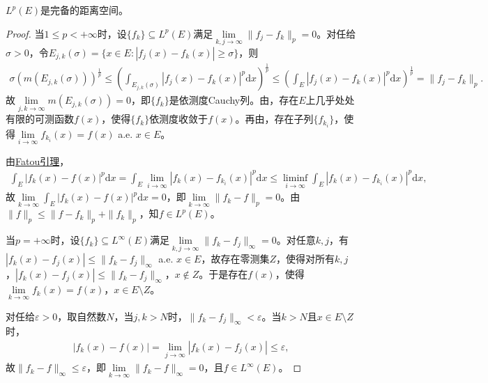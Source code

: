\documentclass[../../main.tex]{subfiles}%
\begin{document}
\begin{theorem}\label{theorem:Riesz-Fischer定理的另一种常用形式}
$L^p(E)$是完备的距离空间。
\end{theorem}
\begin{proof}

当$1\leqslant p<+\infty$时，设$\{f_k\}\subseteq L^p(E)$满足$\lim\limits_{k,j\to\infty}\|f_j-f_k\|_p=0$。对任给$\sigma>0$，令$E_{j,k}(\sigma)=\{x\in E:|f_j(x)-f_k(x)|\geqslant\sigma\}$，则
\begin{align*}
\sigma(m(E_{j,k}(\sigma)))^{\frac{1}{p}}\leqslant\left(\int_{E_{j,k}(\sigma)}|f_j(x)-f_k(x)|^p\mathrm{d}x\right)^{\frac{1}{p}}
\leqslant\left(\int_E|f_j(x)-f_k(x)|^p\mathrm{d}x\right)^{\frac{1}{p}}=\|f_j-f_k\|_p.
\end{align*}
故$\lim\limits_{j,k\to\infty}m(E_{j,k}(\sigma))=0$，即$\{f_k\}$是依测度Cauchy列。由，存在$E$上几乎处处有限的可测函数$f(x)$，使得$\{f_k\}$依测度收敛于$f(x)$。再由，存在子列$\{f_{k_i}\}$，使得$\lim\limits_{i\to\infty}f_{k_i}(x)=f(x)$ a.e. $x\in E$。

由\hyperref[theorem:Fatou引理]{Fatou引理}，
\begin{align*}
\int_E|f_k(x)-f(x)|^p\mathrm{d}x=\int_E\lim\limits_{i\to\infty}|f_k(x)-f_{k_i}(x)|^p\mathrm{d}x
\leqslant\liminf\limits_{i\to\infty}\int_E|f_k(x)-f_{k_i}(x)|^p\mathrm{d}x,
\end{align*}
故$\lim\limits_{k\to\infty}\int_E|f_k(x)-f(x)|^p\mathrm{d}x=0$，即$\lim\limits_{k\to\infty}\|f_k-f\|_p=0$。由$\|f\|_p\leqslant\|f-f_k\|_p+\|f_k\|_p$，知$f\in L^p(E)$。

当$p=+\infty$时，设$\{f_k\}\subseteq L^\infty(E)$满足$\lim\limits_{k,j\to\infty}\|f_k-f_j\|_\infty=0$。对任意$k,j$，有$|f_k(x)-f_j(x)|\leqslant\|f_k-f_j\|_\infty$ a.e. $x\in E$，故存在零测集$Z$，使得对所有$k,j$，$|f_k(x)-f_j(x)|\leqslant\|f_k-f_j\|_\infty$，$x\notin Z$。于是存在$f(x)$，使得$\lim\limits_{k\to\infty}f_k(x)=f(x)$，$x\in E\setminus Z$。

对任给$\varepsilon>0$，取自然数$N$，当$j,k>N$时，$\|f_k-f_j\|_\infty<\varepsilon$。当$k>N$且$x\in E\setminus Z$时，
\begin{align*}
|f_k(x)-f(x)|=\lim\limits_{j\to\infty}|f_k(x)-f_j(x)|\leqslant\varepsilon,
\end{align*}
故$\|f_k-f\|_\infty\leqslant\varepsilon$，即$\lim\limits_{k\to\infty}\|f_k-f\|_\infty=0$，且$f\in L^\infty(E)$。

\end{proof}
\end{document}

